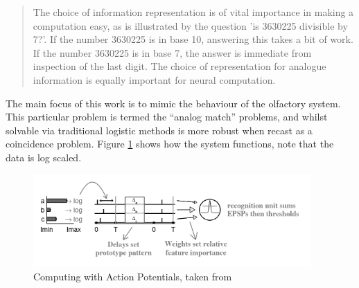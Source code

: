 \documentclass{article}
\begin{document}
\begin{quote}
	The choice of information representation is of vital importance in making a computation easy, as is illustrated by the question 'is 3630225 divisible by 7?'. If the number 3630225 is in base 10, answering this takes a bit of work. If the number 3630225 is in base 7, the answer is immediate from inspection of the last digit. The choice of representation for analogue information is equally important for neural computation. \cite{hopfield1995pattern}
\end{quote}

The main focus of this work is to mimic the behaviour of the olfactory system. This particular problem is termed the ``analog match'' problems, and whilst solvable via traditional logistic methods is more robust when recast as a coincidence problem. Figure \ref{fig:carlos} shows how the system functions, note that the data is log scaled.

\begin{figure}
	\centerline{\includegraphics[width=300pt]{figures/carlos.png}}
	\caption{Computing with Action Potentials, taken from \cite{hopfield1995pattern}}\label{fig:carlos}
\end{figure}
\end{document}
